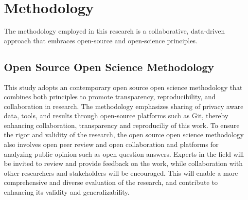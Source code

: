 \documentclass{IEEEtran}
\begin{document}





\section{Methodology}

The methodology employed in this research is a collaborative, data-driven approach that embraces open-source and open-science principles.

\subsection{Open Source Open Science Methodology}

This study adopts an contemporary open source open science methodology that combines both principles to promote transparency, reproducibility, and collaboration in research. The methodology emphasizes sharing of privacy aware data, tools, and results through open-source platforms such as Git, thereby enhancing collaboration, transparency and reproduciliy of this work.
To ensure the rigor and validity of the research, the open source open science methodology also involves open peer review and open collaboration and platforms for analyzing public opinion such as open question answers. Experts in the field will be invited to review and provide feedback on the work, while collaboration with other researchers and stakeholders will be encouraged. This will enable a more comprehensive and diverse evaluation of the research, and contribute to enhancing its validity and generalizability.
\end{document}
